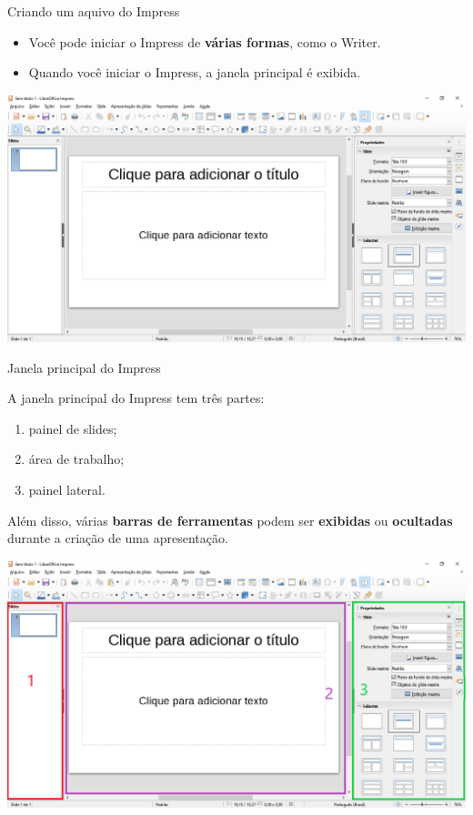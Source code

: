 \begin{frame}{Criando um aquivo do Impress}
	\begin{block}{}
		\begin{itemize}
			\item Você pode iniciar o Impress de \textbf{várias formas}, como o Writer.
			\item Quando você iniciar o Impress, a janela principal é exibida.
		\end{itemize}
	\end{block}

	\centering
	\includegraphics[width=0.8\linewidth]{Figuras/Ch05/fig2}
\end{frame}


\begin{frame}{Janela principal do Impress}
	\begin{block}{}
		A janela principal do Impress tem três partes:
		\begin{enumerate}
			\item painel de slides;
			\item área de trabalho;
			\item painel lateral.
		\end{enumerate}
		Além disso, várias \textbf{barras de ferramentas} podem ser \textbf{exibidas} ou \textbf{ocultadas} durante a criação de uma apresentação.
	\end{block}

	\centering
	\includegraphics[width=0.6\linewidth]{Figuras/Ch05/fig3}
\end{frame}


